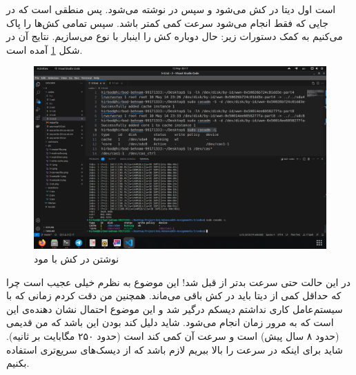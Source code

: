 است اول دیتا در
کش می‌شود و سپس در
نوشته می‌شود. پس منطقی است که در جایی که فقط
انجام می‌شود سرعت کمی کمتر باشد. سپس تمامی کش‌ها را پاک می‌کنیم به کمک دستورات زیر:
حال دوباره کش را اینبار با نوع
می‌سازیم. نتایج آن در شکل
\ref{fig:3-4-wb}
آمده است.
\begin{figure}[H]
    \centering
    \includegraphics[scale=0.25]{pic/3-wb.png}
    \caption{نوشتن در کش با مود }
    \label{fig:3-4-wb}
\end{figure}
در این حالت حتی سرعت بدتر از قبل شد! این موضوع به نظرم خیلی عجیب است چرا که حداقل کمی از دیتا باید در کش باقی
می‌ماند. همچنین من دقت کردم زمانی که با سیستم‌عامل کاری نداشتم دیسکم درگیر شد و این موضوع احتمال نشان دهنده‌ی
این است که به مرور زمان
انجام می‌شود. شاید دلیل کند بودن این باشد که
من قدیمی
(حدود ۸ سال پیش)
است و سرعت آن کمی کند است
(حدود ۲۵۰ مگابایت بر ثانیه).
شاید برای اینکه در
سرعت را بالا ببریم لازم باشد که از دیسک‌های سریع‌تری استفاده بکنیم.

